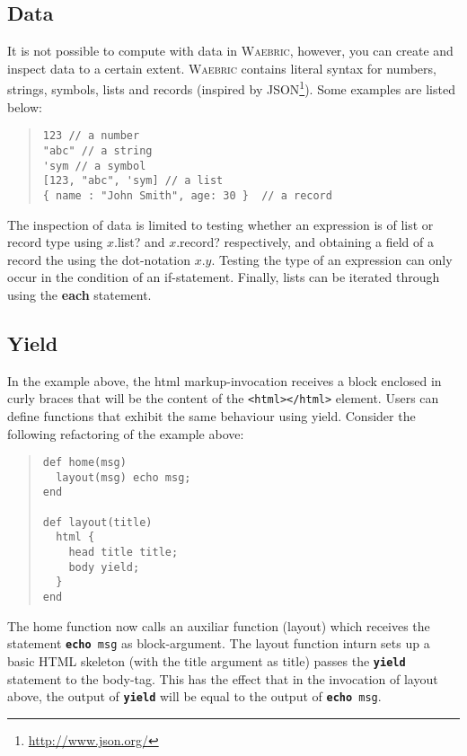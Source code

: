 \documentclass[a4paper]{article}
\def\waebric{\textsc{Waebric}\xspace}
\begin{document}
\subsection{Data}

It is not possible to compute with data in \waebric, however, you can
create and inspect data to a certain extent. \waebric contains literal
syntax for numbers, strings, symbols, lists and records (inspired by
JSON\footnote{\url{http://www.json.org/}}). Some examples are listed below:
\begin{quote}
\begin{lstlisting}[language=waebric]
123 // a number
"abc" // a string
'sym // a symbol
[123, "abc", 'sym] // a list
{ name : "John Smith", age: 30 }  // a record
\end{lstlisting}
\end{quote}

The inspection of data is limited to testing whether an expression is
of list or record type using $x$.list? and $x$.record? respectively,
and obtaining a field of a record the using the dot-notation
$x.y$. Testing the type of an expression can only occur in the
condition of an if-statement. Finally,  lists can be iterated through
using the \textbf{each} statement.

\subsection{Yield}

In the example above, the html markup-invocation receives a block
enclosed in curly braces that will be the content of the
\verb!<html></html>! element. Users can define functions that exhibit
the same behaviour using yield. Consider the following refactoring of
the example above:
\begin{quote}
\begin{lstlisting}[language=waebric]
def home(msg)
  layout(msg) echo msg;
end

def layout(title)
  html {
    head title title;
    body yield;
  }
end
\end{lstlisting}
\end{quote}
The home function now calls an auxiliar function (layout) which
receives the statement \texttt{\textbf{echo} msg} as
block-argument. The layout function inturn sets up a basic HTML
skeleton (with the title argument as title) passes the
\texttt{\textbf{yield}} statement to the body-tag. This has the effect
that in the invocation of layout above, the output of
\texttt{\textbf{yield}} will be equal to the output of
\texttt{\textbf{echo} msg}.
\end{document}
